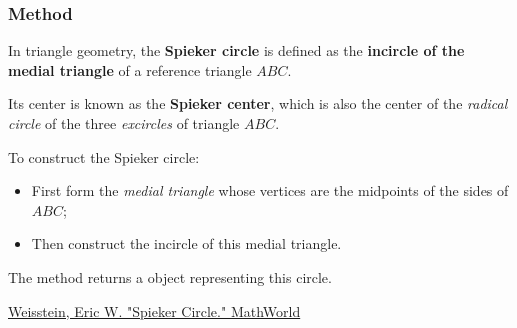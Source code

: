 


\subsubsection{Method } %
\label{ssub:method_triangle_spieker__circle}

In triangle geometry, the \textbf{Spieker circle} is defined as the \textbf{incircle of the medial triangle} of a reference triangle $ABC$.

\medskip
\noindent
Its center is known as the \textbf{Spieker center}, which is also the center of the \emph{radical circle} of the three \emph{excircles} of triangle $ABC$.

\medskip
\noindent
To construct the Spieker circle:
\begin{itemize}
  \item First form the \emph{medial triangle} whose vertices are the midpoints of the sides of $ABC$;
  \item Then construct the incircle of this medial triangle.
\end{itemize}

\noindent
The method  returns a  object representing this circle.

\begin{flushright}
\small
\href{https://mathworld.wolfram.com/SpiekerCircle.html}{Weisstein, Eric W. "Spieker Circle." MathWorld}
\end{flushright}

\vspace{1em}



